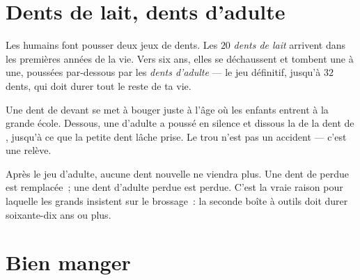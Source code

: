 \section{Dents de lait, dents d'adulte}

\begin{proposition}\label{prop:g2:teeth-and-eating-well:sets}
Les humains font pousser deux jeux de dents. Les $20$ \emph{dents de
lait} arrivent dans les premières années de la
vie. Vers six ans, elles se déchaussent et tombent une à une,
poussées par-dessous par les \emph{dents d'adulte}
--- le jeu définitif, jusqu'à $32$ dents, qui doit durer
tout le reste de ta vie.
\end{proposition}
\admitted

\begin{example}\label{ex:g2:teeth-and-eating-well:wobbly}
Une dent de devant se met à bouger juste à l'âge où les enfants
entrent à la grande école. Dessous, une  d'adulte a poussé
en silence et dissous la  de la dent de , jusqu'à ce que
la petite dent lâche prise. Le trou n'est pas un accident --- c'est
une relève.
\end{example}

\begin{remark}\label{rem:g2:teeth-and-eating-well:nothird}
Après le jeu d'adulte, aucune dent nouvelle ne viendra plus. Une
dent de  perdue est remplacée~; une dent d'adulte perdue est
perdue. C'est la vraie raison pour laquelle les grands insistent sur
le brossage~: la seconde boîte à outils doit durer soixante-dix ans
ou plus.
\end{remark}

\section{Bien manger}

